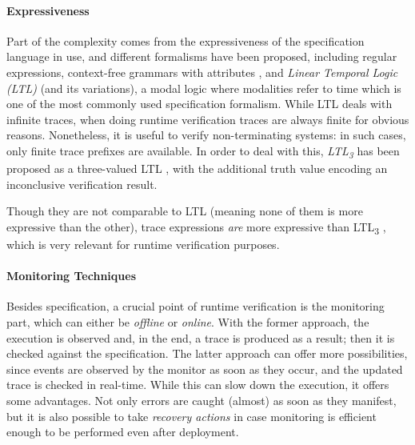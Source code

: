 
\paragraph{Expressiveness}
Part of the complexity comes from the expressiveness of the specification language in use, and different formalisms have been proposed,
including regular expressions, context-free grammars with attributes \cite{de2014combining,BoerEtAl14},
and \emph{Linear Temporal Logic (LTL)} \cite{ltl} (and its variations), a modal logic where modalities refer to time which is
one of the most commonly used specification formalism. 
While LTL deals with infinite traces, when doing runtime verification traces are always finite for obvious reasons.
Nonetheless, it is useful to verify non-terminating systems: in such cases, only finite trace prefixes are available.
In order to deal with this, \emph{LTL\textsubscript{3}} has been proposed as a three-valued LTL \cite{ltl3}, with the additional truth value encoding an inconclusive verification result.

Though they are not comparable to LTL (meaning none of them is more expressive than the other), trace expressions \emph{are} more expressive than LTL\textsubscript{3} \cite{ancona2016comparing}, which is very relevant for runtime verification purposes.

\paragraph{Monitoring Techniques}
Besides specification, a crucial point of runtime verification is the monitoring part, which can either be \emph{offline} or \emph{online}.
With the former approach, the execution is observed and, in the end, a trace is produced as a result; then it is checked against the specification.
The latter approach can offer more possibilities, since events are observed by the monitor as soon as they occur, and the updated trace is checked in real-time.
While this can slow down the execution, it offers some advantages.
Not only errors are caught (almost) as soon as they manifest, but it is also possible to take \emph{recovery actions} \cite{ancona2015global} in case
monitoring is efficient enough to be performed even after deployment.


